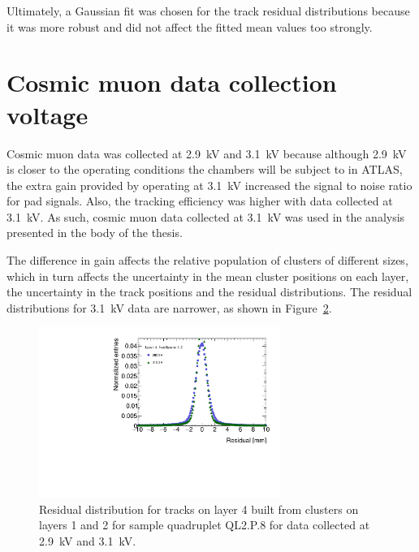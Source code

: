 \begin{figure}
  \caption{}
  \label{fig:double_Gaussian_compare_fits}

\end{figure}
\newpage
\restoregeometry

Ultimately, a Gaussian fit was chosen for the track residual distributions because it was more robust and did not affect the fitted mean values too strongly.

\section{Cosmic muon data collection voltage}
\label{appendix:systematics_2900V_vs_3100V}


Cosmic muon data was collected at \SI{2.9}{kV} and \SI{3.1}{kV} because although \SI{2.9}{kV} is closer to the operating conditions the chambers will be subject to in ATLAS, the extra gain provided by operating at \SI{3.1}{kV} increased the signal to noise ratio for pad signals. Also, the tracking efficiency was higher with data collected at \SI{3.1}{kV}. As such, cosmic muon data collected at \SI{3.1}{kV} was used in the analysis presented in the body of the thesis.

The difference in gain affects the relative population of clusters of different sizes, which in turn affects the uncertainty in the mean cluster positions on each layer, the uncertainty in the track positions and the residual distributions. The residual distributions for \SI{3.1}{kV} data are narrower, as shown in Figure~\ref{fig:res_dist_2900V_3100V_412}.

\begin{figure}
    \centering
    \includegraphics[width = 0.7\textwidth]{figures/figure_residual_distributions_blue_QL2P08_2900V_2021-05-21_green_QL2P08_3100V_2021-05-21_layer4_fixedlayers12.pdf}
    \caption{Residual distribution for tracks on layer 4 built from clusters on layers 1 and 2 for sample quadruplet QL2.P.8 for data collected at \SI{2.9}{kV} and \SI{3.1}{kV}.}
    \label{fig:res_dist_2900V_3100V_412}
\end{figure}

